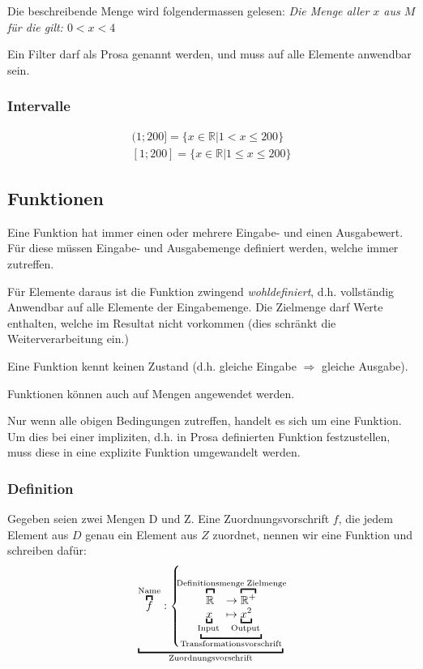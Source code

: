 \begin{multicols}{2}
Die beschreibende Menge wird folgendermassen gelesen:
\emph{Die Menge aller $x$ aus $M$ für die gilt: $0<x<4$} 

Ein Filter darf als Prosa genannt werden, und muss auf alle Elemente anwendbar sein.

\subsubsection{Intervalle}
\begin{align*}
	(1;200] = \{x \in\mathbb{R}|1<x \leq 200\} \\
	[1;200] = \{x\in\mathbb{R}|1\leq x \leq 200\}
\end{align*}

\subsection{Funktionen}
Eine Funktion hat immer einen oder mehrere Eingabe- und einen Ausgabewert. Für diese müssen Eingabe- und Ausgabemenge definiert werden, welche immer zutreffen.

Für Elemente daraus ist die Funktion zwingend \emph{wohldefiniert}, d.h. vollständig Anwendbar auf alle Elemente der Eingabemenge. Die Zielmenge darf Werte enthalten, welche im Resultat nicht vorkommen (dies schränkt die Weiterverarbeitung ein.)

Eine Funktion kennt keinen Zustand (d.h. gleiche Eingabe $\Rightarrow$ gleiche Ausgabe).

Funktionen können auch auf Mengen angewendet werden.

Nur wenn alle obigen Bedingungen zutreffen, handelt es sich um eine Funktion. Um dies bei einer impliziten, d.h. in Prosa definierten Funktion festzustellen, muss diese in eine explizite Funktion umgewandelt werden.


\subsubsection{Definition}
	Gegeben seien zwei Mengen D und Z. Eine Zuordnungsvorschrift $f$, die jedem Element aus $D$ genau ein Element aus $Z$ zuordnet, nennen wir eine Funktion und schreiben dafür:
	\[
		\underbracket{
			\overbracket{f}^\text{Name} : \left\{
			\underbracket{
				\begin{array}{ll}
					\overbracket{
						\mathbb{R}^{\vphantom{+}} %
					}^{
						\mathclap{
							\text{Definitionsmenge}
						}
					}
					& \to \overbracket{
						\mathbb{R}^+
					}^{
						\mathrlap{\!\text{Zielmenge}}
					} \\
					\underbracket{x}_{
						\mathclap{\!\text{Input}}
					}
					& \mapsto \underbracket{x^2}_{
						\mathclap{\!\text{Output}}
					}
				\end{array}
			}_\text{Transformationsvorschrift}
			\right.
		}_\text{Zuordnungsvorschrift}
	\]
	

\end{multicols}
